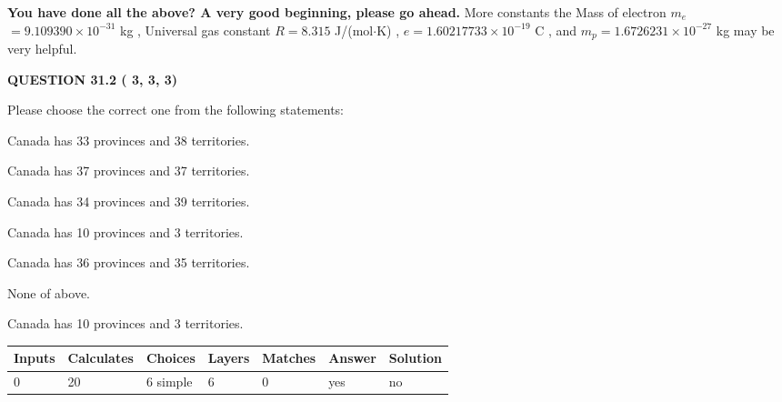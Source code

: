 \documentclass[12pt]{article}
\begin{document}
   
   
   
\vspace{0.3in}
{\textbf{\LARGE{You have done all the above? A very good beginning, please go ahead.}}}
More constants the
Mass of electron
$m_e$$ =
9.109390 \times 10^{-31} $
kg
,
Universal gas constant
$R$$ =
8.315 $
J/(mol$\cdot $K)
,
$e$$ =
1.60217733 \times 10^{-19} $
C
, and
$m_p$$ =
1.6726231 \times 10^{-27} $
kg
%
may be very helpful.
\vspace{0.3in}
   
   
  
\vspace{0.2in}
  
{\textbf{\Large{QUESTION
31.2 
 (          3,          3,          3)
}}}
  
  
Please choose the correct one from the following statements:
 
 
Canada has  %
33 provinces and  %
38 territories.
 
 
Canada has  %
37 provinces and  %
37 territories.
 
 
Canada has  %
34 provinces and  %
39 territories.
 
 
Canada has  %
10 provinces and  %
3 territories.
 
 
Canada has  %
36 provinces and  %
35 territories.
 
 
 None of above.
 
 
\noindent{}
 
 
Canada has  %
10 provinces and  %
3 territories.
 
 
\noindent{}
 
 
   
   
   
   
\noindent\begin{tabular}{|l|l|l|l|l|l|l|}
 \hline
Inputs & Calculates & Choices & Layers & Matches & Answer & Solution \\ \hline
           0 & 
          20 & 
           6
  simple  
  & 
           6 & 
           0 & 
  yes & 
  no 
  \\ \hline
 \end{tabular}
   
\end{document}
